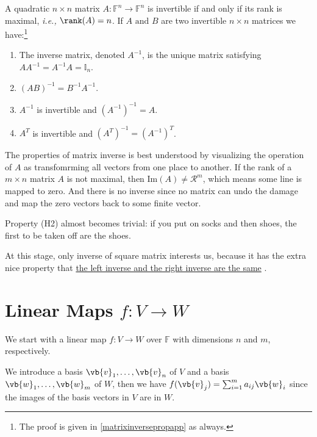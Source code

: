 \documentclass[a4paper,12pt]{report}
\begin{document}
\begin{lemma} \label{matrixinverseprop} 
A quadratic \(n \times n\) matrix \(A:\mathbb{F}^{n}\rightarrow \mathbb{F}^{n}  \) is invertible if and only if its rank is maximal, \textit{i.e.,} \(\rank (A) = n\). If \(A \text { and } B\) are two invertible \(n\times n\) matrices we have:\footnote{The proof is given in \cref{matrixinversepropapp} as always.} 

\begin{enumerate}[label=(\(H\)\arabic*)]
    \item The inverse matrix, denoted \(A^{-1} \), is the unique matrix satisfying \(AA^{-1} = A^{-1} A = \mathbb{I}_{n} \).
    \item \((AB)^{-1} = B^{-1} A^{-1} \).
    \item \(A^{-1} \) is invertible and \((A^{-1} )^{-1} = A\).
    \item \(A^{T} \) is invertible and \((A^{T} ) ^{-1} = (A^{-1} )^{T} \).   
\end{enumerate}
\end{lemma}


The properties of matrix inverse is best understood by visualizing the operation of \(A\) as transfomrming all vectors from one place to another. If the rank of a \(m \times n\) matrix \(A\) is not maximal, then \(\text{Im}(A) \neq \mathcal{R}^{m} \), which means some line is mapped to zero. And there is no inverse since no matrix can undo the damage and map the zero vectors back to some finite vector.

Property (H2) almost becomes trivial: if you put on socks and then shoes, the first to be taken off are the shoes.

At this stage, only inverse of square matrix interests us, because it has the extra nice property that \href{https:////en.wikipedia.org//wiki//Generalized_inverse}{the left inverse and the right inverse are the same} .

\section{Linear Maps \(f: V \rightarrow W\)} \label{relations} 

We start with a linear map \(f:V \rightarrow W\) over \(\mathbb{F}\) with dimensions \(n\) and \(m\), respectively. 

We introduce a basis \(\vb{v}_{1}, \ldots, \vb{v}_n \) of \(V\) and a basis \(\vb{w}_{1}, \ldots, \vb{w}_m \) of \(W\), then we have \(f(\vb{v} _{j} ) = \sum_{i=1}^{m} a_{ij} \vb{w} _{i} \) since the images of the basis vectors in \(V\) are in \(W\). 
\end{document}
